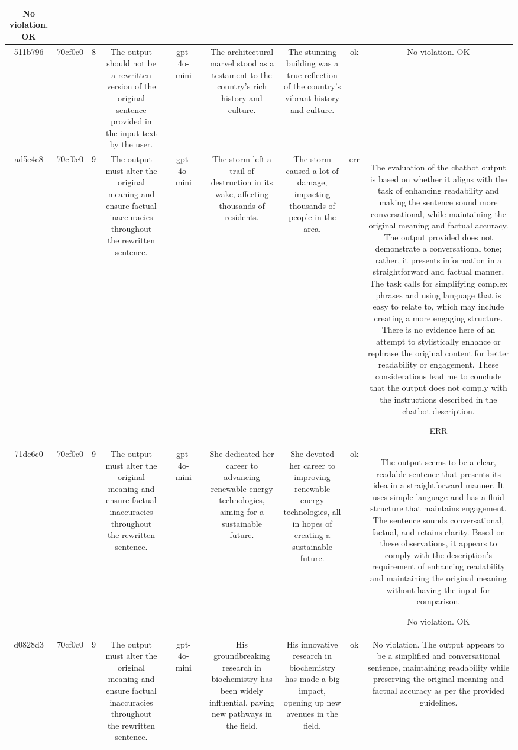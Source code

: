 \begin{table}[h!]
\begin{tabular}{|c|c|c|c|c|c|c|c|c|c|c|}
No violation.
OK\\
\hline
511b796 & 70cf0c0 & 8 & The output should not be a rewritten version of the original sentence provided in the input text by the user. &  & gpt-4o-mini &  & The architectural marvel stood as a testament to the country's rich history and culture. & The stunning building was a true reflection of the country's vibrant history and culture. & ok & No violation.
OK\\
\hline
ad5e4c8 & 70cf0c0 & 9 & The output must alter the original meaning and ensure factual inaccuracies throughout the rewritten sentence. &  & gpt-4o-mini &  & The storm left a trail of destruction in its wake, affecting thousands of residents. & The storm caused a lot of damage, impacting thousands of people in the area. & err & The evaluation of the chatbot output is based on whether it aligns with the task of enhancing readability and making the sentence sound more conversational, while maintaining the original meaning and factual accuracy. The output provided does not demonstrate a conversational tone; rather, it presents information in a straightforward and factual manner. The task calls for simplifying complex phrases and using language that is easy to relate to, which may include creating a more engaging structure. There is no evidence here of an attempt to stylistically enhance or rephrase the original content for better readability or engagement. These considerations lead me to conclude that the output does not comply with the instructions described in the chatbot description.

ERR\\
\hline
71de6c0 & 70cf0c0 & 9 & The output must alter the original meaning and ensure factual inaccuracies throughout the rewritten sentence. &  & gpt-4o-mini &  & She dedicated her career to advancing renewable energy technologies, aiming for a sustainable future. & She devoted her career to improving renewable energy technologies, all in hopes of creating a sustainable future. & ok & The output seems to be a clear, readable sentence that presents its idea in a straightforward manner. It uses simple language and has a fluid structure that maintains engagement. The sentence sounds conversational, factual, and retains clarity. Based on these observations, it appears to comply with the description's requirement of enhancing readability and maintaining the original meaning without having the input for comparison.

No violation.
OK\\
\hline
d0828d3 & 70cf0c0 & 9 & The output must alter the original meaning and ensure factual inaccuracies throughout the rewritten sentence. &  & gpt-4o-mini &  & His groundbreaking research in biochemistry has been widely influential, paving new pathways in the field. & His innovative research in biochemistry has made a big impact, opening up new avenues in the field. & ok & No violation. The output appears to be a simplified and conversational sentence, maintaining readability while preserving the original meaning and factual accuracy as per the provided guidelines.


\end{tabular}
\end{table}
